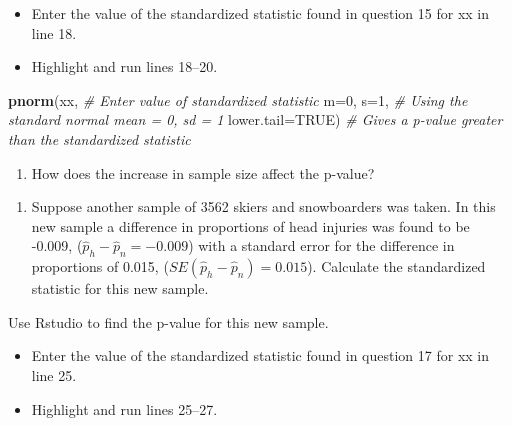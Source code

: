 \documentclass[
]{report}
\newenvironment{Shaded}{\begin{snugshade}}{\end{snugshade}}
\newcommand{\AttributeTok}[1]{\textcolor[rgb]{0.13,0.29,0.53}{#1}}
\newcommand{\CommentTok}[1]{\textcolor[rgb]{0.56,0.35,0.01}{\textit{#1}}}
\newcommand{\ConstantTok}[1]{\textcolor[rgb]{0.56,0.35,0.01}{#1}}
\newcommand{\DecValTok}[1]{\textcolor[rgb]{0.00,0.00,0.81}{#1}}
\newcommand{\FunctionTok}[1]{\textcolor[rgb]{0.13,0.29,0.53}{\textbf{#1}}}
\newcommand{\NormalTok}[1]{#1}
\providecommand{\tightlist}{%
  \setlength{\itemsep}{0pt}\setlength{\parskip}{0pt}}
\begin{document}
\begin{itemize}
\item
  Enter the value of the standardized statistic found in question 15 for xx in line 18.
\item
  Highlight and run lines 18--20.
\end{itemize}

\begin{Shaded}
\begin{Highlighting}[]
\FunctionTok{pnorm}\NormalTok{(xx, }\CommentTok{\# Enter value of standardized statistic}
      \AttributeTok{m=}\DecValTok{0}\NormalTok{, }\AttributeTok{s=}\DecValTok{1}\NormalTok{, }\CommentTok{\# Using the standard normal mean = 0, sd = 1}
      \AttributeTok{lower.tail=}\ConstantTok{TRUE}\NormalTok{) }\CommentTok{\# Gives a p{-}value greater than the standardized statistic}
\end{Highlighting}
\end{Shaded}

\begin{enumerate}
\def\labelenumi{\arabic{enumi}.}
\setcounter{enumi}{15}
\tightlist
\item
  How does the increase in sample size affect the p-value?
\end{enumerate}

\vspace{0.4in}

\begin{enumerate}
\def\labelenumi{\arabic{enumi}.}
\setcounter{enumi}{16}
\tightlist
\item
  Suppose another sample of 3562 skiers and snowboarders was taken. In this new sample a difference in proportions of head injuries was found to be -0.009, (\(\hat{p}_h - \hat{p}_n = -0.009\)) with a standard error for the difference in proportions of 0.015, (\(SE(\hat{p}_h - \hat{p}_n) = 0.015\)). Calculate the standardized statistic for this new sample.
\end{enumerate}

\vspace{0.5in}

Use Rstudio to find the p-value for this new sample.

\begin{itemize}
\item
  Enter the value of the standardized statistic found in question 17 for xx in line 25.
\item
  Highlight and run lines 25--27.
\end{itemize}
\end{document}
